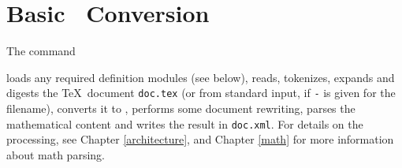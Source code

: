 \documentclass{report}
\begin{document}
\section[Conversion]{Basic \XML\ Conversion}\label{usage.conversion}
The command
\begin{quote}
\end{quote}
loads any required definition modules (see below),
reads, tokenizes, expands and digests the \TeX\ document \texttt{doc.tex}
(or from standard input, if \texttt{-} is given for the filename),
converts it to \XML,
performs some document rewriting, parses the mathematical content
and writes the result in \texttt{doc.xml}.
For details on the processing, see Chapter \ref{architecture},
and Chapter \ref{math} for more information about math parsing.
\end{document}
